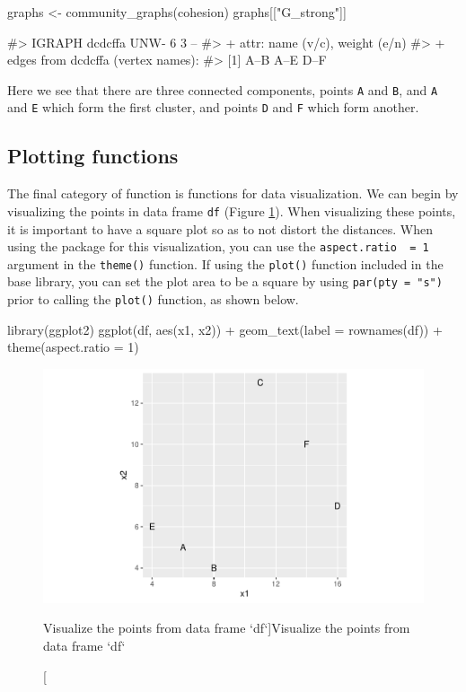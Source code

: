 \begin{Schunk}
\begin{Sinput}
graphs <- community_graphs(cohesion)
graphs[["G_strong"]]
\end{Sinput}
\begin{Soutput}
#> IGRAPH dcdcffa UNW- 6 3 -- 
#> + attr: name (v/c), weight (e/n)
#> + edges from dcdcffa (vertex names):
#> [1] A--B A--E D--F
\end{Soutput}
\end{Schunk}

Here we see that there are three connected components, points \texttt{A}
and \texttt{B}, and \texttt{A} and \texttt{E} which form the first
cluster, and points \texttt{D} and \texttt{F} which form another.

\hypertarget{plotting-functions}{%
\subsection{Plotting functions}\label{plotting-functions}}

The final category of function is functions for data visualization. We
can begin by visualizing the points in data frame \texttt{df} (Figure
\ref{fig:fig1}). When visualizing these points, it is important to have
a square plot so as to not distort the distances. When using the
 package for this visualization, you can use the
\texttt{aspect.ratio\ \ =\ 1} argument in the \texttt{theme()} function.
If using the \texttt{plot()} function included in the base library, you
can set the plot area to be a square by using \texttt{par(pty\ =\ "s")}
prior to calling the \texttt{plot()} function, as shown below.

\begin{Schunk}
\begin{Sinput}
library(ggplot2)
ggplot(df, aes(x1, x2)) +
  geom_text(label = rownames(df)) + 
  theme(aspect.ratio = 1)
\end{Sinput}
\begin{figure}
\includegraphics{manuscript_files/figure-latex/fig1-1} \caption[Visualize the points from data frame `df`]{Visualize the points from data frame `df`}\label{fig:fig1}
\end{figure}
\end{Schunk}

